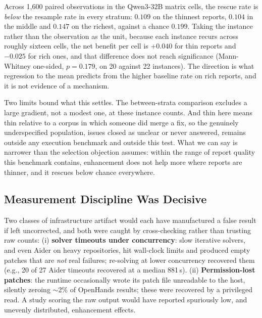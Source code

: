 \documentclass[journal]{IEEEtran}
\begin{document}
Across 1,600 paired observations in the Qwen3-32B matrix cells, the rescue rate is
\emph{below} the resample rate in every stratum: $0.109$ on the thinnest reports, $0.104$ in
the middle and $0.147$ on the richest, against a chance $0.199$. Taking the instance rather
than the observation as the unit, because each instance recurs across roughly sixteen cells,
the net benefit per cell is $+0.040$ for thin reports and $-0.025$ for rich ones, and that
difference does not reach significance (Mann-Whitney one-sided, $p = 0.179$, on 20 against 22
instances). The direction is what regression to the mean predicts from the higher baseline
rate on rich reports, and it is not evidence of a mechanism.

Two limits bound what this settles. The between-strata comparison excludes a large gradient,
not a modest one, at these instance counts. And thin here means thin relative to a corpus in
which someone did merge a fix, so the genuinely underspecified population, issues closed as
unclear or never answered, remains outside any execution benchmark and outside this test. What
we can say is narrower than the selection objection assumes: within the range of report quality
this benchmark contains, enhancement does not help more where reports are thinner, and it
rescues below chance everywhere.

\subsection{Measurement Discipline Was Decisive}
Two classes of infrastructure artifact would each have manufactured a false result if left uncorrected, and both were caught by cross-checking rather than trusting raw counts: (i) \textbf{solver timeouts under concurrency}: slow iterative solvers, and even Aider on heavy repositories, hit wall-clock limits and produced empty patches that are \emph{not} real failures; re-solving at lower concurrency recovered them (e.g., 20 of 27 Aider timeouts recovered at a median 881\,s). (ii) \textbf{Permission-lost patches}: the runtime occasionally wrote its patch file unreadable to the host, silently zeroing $\sim$2\% of OpenHands results; these were recovered by a privileged read. A study scoring the raw output would have reported spuriously low, and unevenly distributed, enhancement effects.
\end{document}
